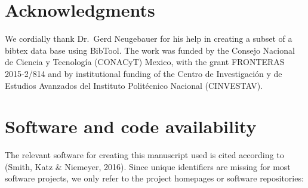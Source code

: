 \documentclass[10pt,fleqn]{wlpeerj}
\begin{document}
\section{Acknowledgments}\label{acknowledgments}

We
cordially
thank
Dr.~Gerd
Neugebauer
for
his
help
in
creating
a
subset
of a
bibtex
data
base
using
BibTool.
The
work
was
funded
by
the
Consejo
Nacional
de
Ciencia
y
Tecnología
(CONACyT)
Mexico,
with
the
grant
FRONTERAS
2015-2/814
and
by
institutional
funding
of
the
Centro
de
Investigación
y de
Estudios
Avanzados
del
Instituto
Politécnico
Nacional
(CINVESTAV).

\section{Software
and
code
availability}\label{software-and-code-availability}

The
relevant
software
for
creating
this
manuscript
used
is
cited
according
to
(Smith,
Katz
\&
Niemeyer,
2016).
Since
unique
identifiers
are
missing
for
most
software
projects,
we
only
refer
to
the
project
homepages
or
software
repositories:
\end{document}

